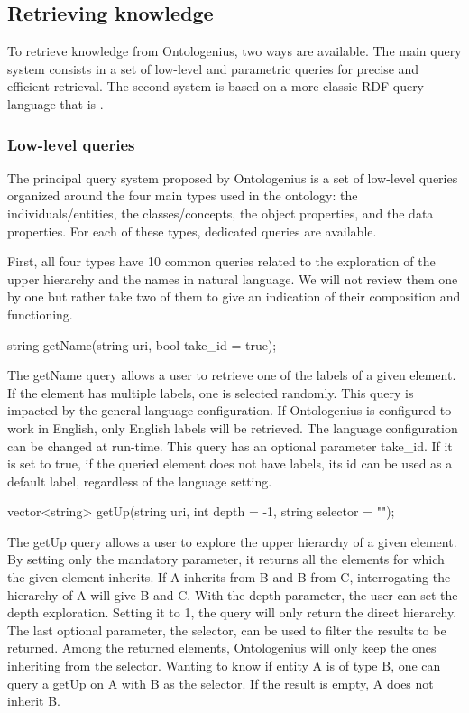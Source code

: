 \subsection{Retrieving knowledge}

To retrieve knowledge from Ontologenius, two ways are available. The main query system consists in a set of low-level and parametric queries for precise and efficient retrieval. The second system is based on a more classic RDF query language that is \sparql{}.

\subsubsection{Low-level queries}

The principal query system proposed by Ontologenius is a set of low-level queries organized around the four main types used in the ontology: the individuals/entities, the classes/concepts, the object properties, and the data properties. For each of these types, dedicated queries are available.

First, all four types have 10 common queries related to the exploration of the upper hierarchy and the names in natural language. We will not review them one by one but rather take two of them to give an indication of their composition and functioning. 

\begin{verbatimtab}
string getName(string uri, 
               bool take_id = true);
\end{verbatimtab}

The getName query allows a user to retrieve one of the labels of a given element. If the element has multiple labels, one is selected randomly. This query is impacted by the general language configuration. If Ontologenius is configured to work in English, only English labels will be retrieved. The language configuration can be changed at run-time. This query has an optional parameter take\_id. If it is set to true, if the queried element does not have labels, its id can be used as a default label, regardless of the language setting. 

\begin{verbatimtab}
vector<string> getUp(string uri,
                     int depth = -1, 
                     string selector = "");
\end{verbatimtab}

The getUp query allows a user to explore the upper hierarchy of a given element. By setting only the mandatory parameter, it returns all the elements for which the given element inherits. If A inherits from B and B from C, interrogating the hierarchy of A will give B and C. With the depth parameter, the user can set the depth exploration. Setting it to 1, the query will only return the direct hierarchy. The last optional parameter, the selector, can be used to filter the results to be returned. Among the returned elements, Ontologenius will only keep the ones inheriting from the selector. Wanting to know if entity A is of type B, one can query a getUp on A with B as the selector. If the result is empty, A does not inherit B.

